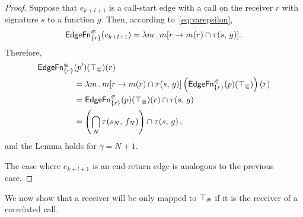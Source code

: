 \begin{proof}
Suppose that $e_{k+l+1}$ is a call-start edge with a call on the receiver $r$ with signature $s$ to a function $g$. Then, according to~\eqref{eq:varepsilon}, 
\[
  \textsf{EdgeFn}^\Subset_{\{r\}}(e_{k+l+1})=\lambda m\,.\,m[r\to m(r)\cap\tau(s,\,g)]\,.
\]
Therefore,
\begin{align*}
  \textsf{EdgeFn}^\Subset_{\{r\}}&(p')(\top_\Subset)(r)\\
  &=\lambda m\,.\,m[r\to m(r)\cap\tau(s,\,g)]\left(\textsf{EdgeFn}^\Subset_{\{r\}}(p)(\top_\Subset)\right)(r)\\
  &=\textsf{EdgeFn}^\Subset_{\{r\}}(p)(\top_\Subset)(r)\cap\tau(s,\,g)\\
  &=\left(\bigcap_{N}\tau(s_N,\,f_N)\right)\cap\tau(s,\,g)\,,
\end{align*}
and the Lemma holds for $\gamma=N+1$.

The case where $e_{k+l+1}$ is an end-return edge is analogous to the previous case.
\end{proof}

We now show that a receiver will be only mapped to $\top_\Subset$ if it is the receiver of a correlated call.

